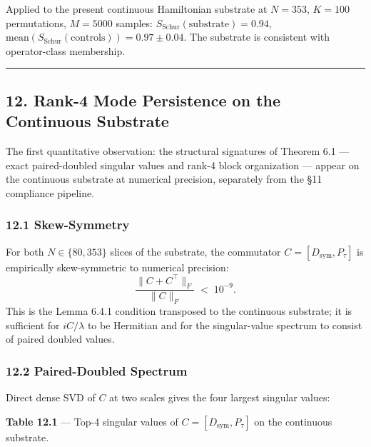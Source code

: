 \documentclass[
  11pt,
]{article}
\begin{document}
Applied to the present continuous Hamiltonian substrate at \(N = 353\),
\(K = 100\) permutations, \(M = 5000\) samples:
\(S_\text{Schur}(\text{substrate}) = 0.94\),
\(\mathrm{mean}(S_\text{Schur}(\text{controls})) = 0.97 \pm 0.04\). The
substrate is consistent with operator-class membership.

\begin{center}\rule{0.5\linewidth}{0.5pt}\end{center}

\subsection{12. Rank-4 Mode Persistence on the Continuous
Substrate}\label{rank-4-mode-persistence-on-the-continuous-substrate}

The first quantitative observation: the structural signatures of Theorem
6.1 --- exact paired-doubled singular values and rank-4 block
organization --- appear on the continuous substrate at numerical
precision, separately from the §11 compliance pipeline.

\subsubsection{12.1 Skew-Symmetry}\label{skew-symmetry}

For both \(N \in \{80, 353\}\) slices of the substrate, the commutator
\(C = [D_\text{sym}, P_\tau]\) is empirically skew-symmetric to
numerical precision:
\[\frac{\|C + C^\top\|_F}{\|C\|_F} \;<\; 10^{-9}. \tag{12.1}\] This is
the Lemma 6.4.1 condition transposed to the continuous substrate; it is
sufficient for \(iC/\lambda\) to be Hermitian and for the singular-value
spectrum to consist of paired doubled values.

\subsubsection{12.2 Paired-Doubled
Spectrum}\label{paired-doubled-spectrum}

Direct dense SVD of \(C\) at two scales gives the four largest singular
values:

\textbf{Table 12.1} --- Top-4 singular values of
\(C = [D_\text{sym}, P_\tau]\) on the continuous substrate.
\end{document}
